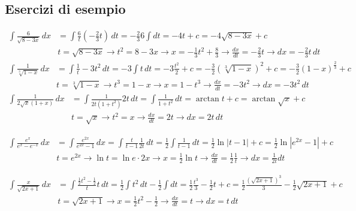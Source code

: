 \documentclass[11pt]{article}
\begin{document}
\subsection*{Esercizi di esempio}
\begin{align*} \int \frac{6}{\sqrt{8-3x}}\,dx&=\int \frac{6}{t}(-\frac{2}{3}t)\,dt=-\frac{2}{3} 6 \int dt =-4t+c=-4\sqrt{8-3x}+c\\&t=\sqrt{8-3x} \longrightarrow t^2=8-3x  \longrightarrow \boxed{x=-\frac{1}{3}t^2+\frac{8}{3}} \longrightarrow \frac{dx}{dt}=-\frac{2}{3}t \longrightarrow \boxed{dx=-\frac{2}{3}t\,dt}\end{align*}
\begin{align*}\int \frac{1}{\sqrt[3]{1-x}}\,dx&=\int \frac{1}{t}-3t^2\,dt=-3\int t\,dt=-3\frac{t^2}{2}+c=-\frac{3}{2}(\sqrt[3]{1-x})^2+c=-\frac{3}{2}(1-x)^{\frac{2}{3}}+c\\&t=\sqrt[3]{1-x} \longrightarrow t^3 = 1-x \longrightarrow \boxed{x=1-t^3}\longrightarrow \frac{dx}{dt}=-3t^2 \longrightarrow \boxed{dx = -3t^2\,dt}\end{align*}
\begin{align*} \int \frac{1}{2\sqrt{x}(1+x)}\,dx&=\int \frac{1}{2t(1+t^2)}2t\,dt=\int \frac{1}{1+t^2}\,dt=\arctan t + c = \arctan \sqrt{x} + c\\&t=\sqrt{x} \longrightarrow \boxed{t^2 = x} \longrightarrow \frac{dx}{dt}=2t \longrightarrow \boxed{dx=2t\,dt}\end{align*}

\begin{align*}\int \frac{e^x}{e^x-e^{-x}}\,dx&=\int \frac{e^{2x}}{e^{2x}-1}\,dx=\int \frac{t}{t-1}\frac{1}{2t}\,dt=\frac{1}{2}\int \frac{1}{t-1}\,dt=\frac{1}{2}\ln |t-1|+c=\frac{1}{2}\ln|e^{2x}-1|+c\\&t=e^{2x} \longrightarrow \ln t = \ln e\cdot 2x \longrightarrow \boxed{x=\frac{1}{2} \ln t} \longrightarrow \frac{dx}{dt}=\frac{1}{2} \frac{1}{t} \longrightarrow \boxed{dx=\frac{1}{2t}dt}\end{align*}

\begin{align*} \int \frac{x}{\sqrt{2x+1}}\,dx&=\int \frac{\frac{1}{2}t^2-\frac{1}{2}}{t}t\,dt=\frac{1}{2} \int t^2\,dt-\frac{1}{2}\int dt=\frac{1}{2}\frac{t^3}{3}-\frac{1}{2}t+c=\frac{1}{2}\frac{(\sqrt{2x+1})^3}{3}-\frac{1}{2}\sqrt{2x+1}+c\\&t=\sqrt{2x+1} \longrightarrow \boxed{x = \frac{1}{2}t^2-\frac{1}{2}} \longrightarrow \frac{dx}{dt}=t \longrightarrow \boxed{dx=t\,dt}\end{align*}
\end{document}

